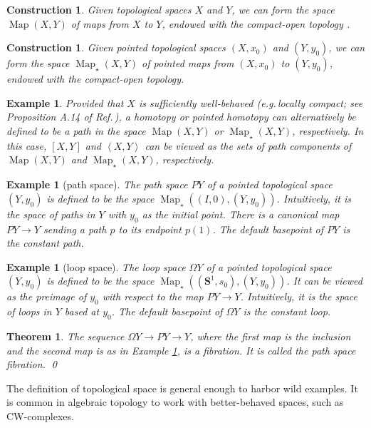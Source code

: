 \documentclass[sort&compress]{elsarticle}
\theoremstyle{theoremstyle}
\newtheorem{thm}[nul]{Theorem}
\theoremstyle{framedtheoremstyle}
\theoremstyle{definitionstyle}
\theoremstyle{definitionstyle}
\theoremstyle{definitionstyle}
\theoremstyle{definitionstyle}
\newtheorem{exm}[nul]{Example}
\newtheorem{cnstr}[nul]{Construction}
\theoremstyle{nameddefinitionstyle}
\theoremstyle{framednameddefinitionstyle}
\theoremstyle{proofstyle}
\theoremstyle{definitionstyle}
\newcommand{\fromto}{\rightarrow}
\renewcommand{\SS}{\mathbf{S}}
\DeclareMathOperator{\Map}{Map}
\newcommand{\paren}[1]{\left( #1 \right)}
\newcommand{\angles}[1]{\left\langle #1 \right\rangle}
\newcommand{\brackets}[1]{\left[ #1 \right]}
\begin{document}
\begin{appendices}
\begin{cnstr}
Given topological spaces $X$ and $Y$, we can form the space $\Map(X, Y)$ of maps from $X$ to $Y$, endowed with the compact-open topology \cite{Hatcher}.
\end{cnstr}

\begin{cnstr}
Given pointed topological spaces $(X,x_0)$ and $(Y,y_0)$, we can form the space $\Map_\star(X, Y)$ of pointed maps from $(X,x_0)$ to $(Y,y_0)$, endowed with the compact-open topology.
\end{cnstr}

\begin{exm}
Provided that $X$ is sufficiently well-behaved (e.g.\,locally compact; see Proposition A.14 of Ref.\,\cite{Hatcher}), a homotopy or pointed homotopy can alternatively be defined to be a path in the space $\Map(X, Y)$ or $\Map_\star(X, Y)$, respectively. In this case, $\brackets{X,Y}$ and $\angles{X, Y}$ can be viewed as the sets of path components of $\Map(X, Y)$ and $\Map_\star(X, Y)$, respectively.
\end{exm}

\begin{exm}[path space]\label{exm:path_space}
The path space $PY$ of a pointed topological space $(Y, y_0)$ is defined to be the space $\Map_\star\paren{(I,0), (Y,y_0)}$. Intuitively, it is the space of paths in $Y$ with $y_0$ as the initial point. There is a canonical map $PY \fromto Y$ sending a path $p$ to its endpoint $p(1)$. The default basepoint of $P Y$ is the constant path.
\end{exm}

\begin{exm}[loop space]
The loop space $\Omega Y$ of a pointed topological space $(Y,y_0)$ is defined to be the space $\Map_\star\paren{(\SS^1,s_0), (Y,y_0)}$. It can be viewed as the preimage of $y_0$ with respect to the map $PY \fromto Y$. Intuitively, it is the space of loops in $Y$ based at $y_0$. The default basepoint of $\Omega Y$ is the constant loop.
\end{exm}

\begin{thm}
The sequence $\Omega Y \fromto PY \fromto Y$, where the first map is the inclusion and the second map is as in Example \ref{exm:path_space}, is a fibration. It is called the path space fibration.
\qed\end{thm}

The definition of topological space is general enough to harbor wild examples. It is common in algebraic topology to work with better-behaved spaces, such as CW-complexes.


\end{appendices}
\end{document}
